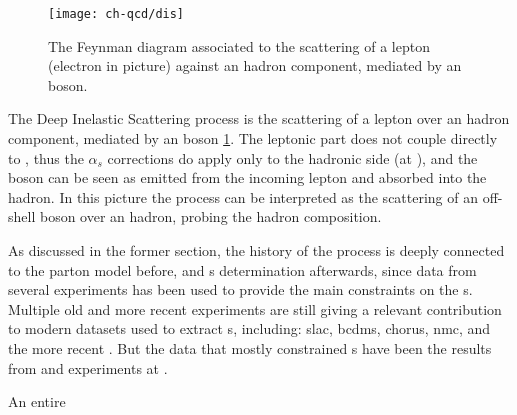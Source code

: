 \begin{figure}
	\centering
	\texttt{[image: ch-qcd/dis]}
	\caption{
		The \lo Feynman diagram associated to the scattering of a lepton (electron
		in picture) against an hadron component, mediated by an \ew boson.
	}
	\label{fig:qcd/dis}
\end{figure}

The Deep Inelastic Scattering process is the scattering of a lepton over an
hadron component, mediated by an \ew boson \cref{fig:qcd/dis}.
%
The leptonic part does not couple directly to \qcd , thus the $\alpha_s$
corrections do apply only to the hadronic side (at \lo \ew), and the \ew boson
can be seen as emitted from the incoming lepton and absorbed into the hadron.
%
In this picture the process can be interpreted as the scattering of an
off-shell \ew boson over an hadron, probing the hadron composition.

As discussed in the former section, the history of the \dis process is deeply
connected to the parton model before, and \pdf{}s determination afterwards,
since data from several \dis experiments has been used to provide the main
constraints on the \pdf{}s.
%
Multiple old and more recent \dis experiments are still giving a relevant
contribution to modern datasets used to extract \pdf{}s, including:
\acrfull{slac}, \acrfull{bcdms}, \acrfull{chorus}, \acrfull{nmc}, and the more
recent \nutev.
%
But the \dis data that mostly constrained \pdf{}s have been the results from
\hone and \zeus experiments at \hera.

An entire
